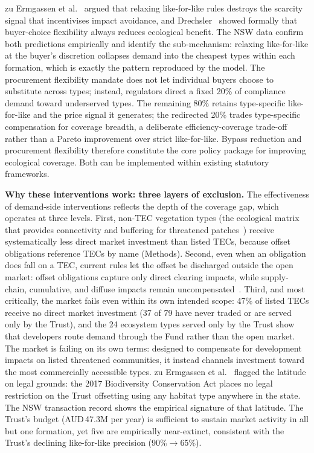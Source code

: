 \documentclass[pdflatex,sn-nature,oneside]{sn-jnl}
\begin{document}
zu Ermgassen et al.~\cite{zuErmgassen2020} argued that relaxing
like-for-like rules destroys the scarcity signal that incentivises
impact avoidance, and Drechsler~\cite{Drechsler2024} showed formally
that buyer-choice flexibility always reduces ecological benefit. The
NSW data confirm both predictions empirically and identify the
sub-mechanism: relaxing like-for-like at the buyer's discretion
collapses demand into the cheapest types within each formation,
which is exactly the pattern reproduced by the model.
The procurement flexibility mandate does not let individual buyers choose to
substitute across types; instead, regulators direct a fixed 20\% of
compliance demand toward underserved types. The remaining 80\% retains
type-specific like-for-like and the price signal it generates; the redirected
20\% trades type-specific compensation for coverage breadth, a deliberate
efficiency-coverage trade-off rather than a Pareto improvement over
strict like-for-like.
Bypass reduction and procurement flexibility therefore constitute
the core policy package for improving ecological coverage. Both can be
implemented within existing statutory frameworks.

\textbf{Why these interventions work: three layers of exclusion.}
The effectiveness of demand-side interventions reflects the depth of the
coverage gap, which operates at three levels.
First, non-TEC vegetation types (the ecological matrix that provides
connectivity and buffering for threatened
patches~\cite{FischerLindenmayer2007}) receive systematically
less direct market investment than listed TECs, because offset obligations
reference TECs by name (Methods).
Second, even when an obligation does fall on a TEC, current rules let
the offset be discharged outside the open market: offset obligations
capture only direct clearing impacts, while supply-chain, cumulative,
and diffuse impacts remain uncompensated~\cite{Mace2012}.
Third, and most critically, the market fails even within its own intended
scope: 47\% of listed TECs receive no direct market investment (37 of 79
have never traded or are served only by the Trust), and the 24 ecosystem
types served only by the Trust show that developers route demand through
the Fund rather than the open market.
The market is failing on its own terms: designed to compensate for
development impacts on listed threatened communities, it instead
channels investment toward the most commercially accessible types. zu Ermgassen
et al.~\cite{zuErmgassen2020} flagged the latitude on legal grounds:
the 2017 Biodiversity Conservation Act places no legal restriction on
the Trust offsetting using any habitat type anywhere in the state.
The NSW transaction record shows the empirical signature of that
latitude. The Trust's budget (AUD\,47.3M per year) is sufficient to
sustain market activity in all but one formation, yet five are empirically
near-extinct, consistent with the Trust's declining like-for-like
precision (90\%$\to$65\%).
\end{document}
